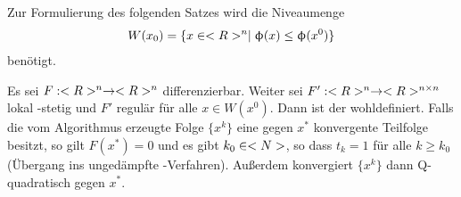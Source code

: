 Zur Formulierung des folgenden Satzes wird die Niveaumenge
\begin{align}
	W(x_0) = \{x\in<R>^n\mid \upphi(x) \le \upphi(x^0)\}\notag
\end{align}
benötigt.

\begin{proposition}
	Es sei $F:<R>^n\to<R>^n$ differenzierbar. Weiter sei $F':<R>^n\to<R>^{n\times n}$ lokal -stetig und $F'$ regulär für alle $x\in W(x^0)$. Dann ist der  wohldefiniert. Falls die vom Algorithmus erzeugte Folge $\{x^k\}$ eine gegen $x^\ast$ konvergente Teilfolge besitzt, so gilt $F(x^\ast)=0$ und es gibt $k_0\in<N>$, so dass $t_k=1$ für alle $k\ge k_0$ (Übergang ins ungedämpfte -Verfahren). Außerdem konvergiert $\{x^k\}$ dann Q-quadratisch gegen $x^\ast$.
\end{proposition}
